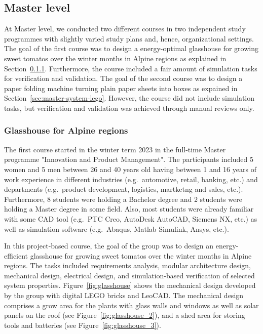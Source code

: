 \documentclass{PDS}
\begin{document}
\subsection{Master level}
\label{sec:master}

At Master level, we conducted two different courses in two independent study programmes with slightly varied study plans and, hence, organizational settings.
The goal of the first course was to design a energy-optimal glasshouse for growing sweet tomatos over the winter months in Alpine regions as explained in Section~\ref{sec:master-product-lego}.
Furthermore, the course included a fair amount of simulation tasks for verification and validation.
The goal of the second course was to design a paper folding machine turning plain paper sheets into boxes as expained in Section~\ref{sec:master-system-lego}.
However, the course did not include simulation tasks, but verification and validation was achieved through manual reviews only.

\subsubsection{Glasshouse for Alpine regions}
\label{sec:master-product-lego}

The first course started in the winter term 2023 in the full-time Master programme "Innovation and Product Management".
The participants included 5 women and 5 men between 26 and 40 years old having between 1 and 16 years of work experience in different industries (e.g.\ automotive, retail, banking, etc.) and departments (e.g.\ product development, logistics, martketng and sales, etc.).
Furthermore, 8 students were holding a Bachelor degree and 2 students were holding a Master degree in some field.
Also, most students were already familiar with some CAD tool (e.g.\ PTC Creo, AutoDesk AutoCAD, Siemens NX, etc.) as well as simulation software (e.g.\ Abaqus, Matlab Simulink, Ansys, etc.).

In this project-based course, the goal of the group was to design an energy-efficient glasshouse for growing sweet tomatos over the winter months in Alpine regions.
The tasks included requirements analysis, modular architecture design, mechanical design, electrical design, and simulation-based verification of selected system properties.
Figure~\ref{fig:glasshouse} shows the mechanical design developed by the group with digital LEGO bricks and LeoCAD.
The mechanical design comprises a grow area for the plants with glass walls and windows as well as solar panels on the roof (see Figure~\ref{fig:glasshouse_2}), and a shed area for storing tools and batteries (see Figure~\ref{fig:glasshouse_3}).
\end{document}
